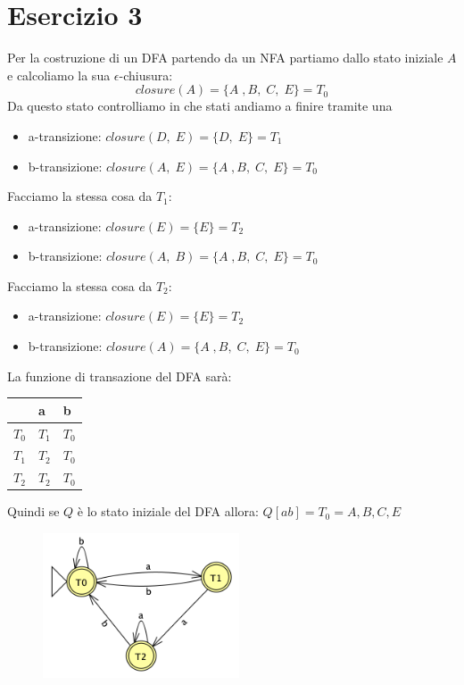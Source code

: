 \documentclass[11pt]{article}
\begin{document}
\section*{Esercizio 3}
Per la costruzione di un DFA partendo da un NFA partiamo dallo
stato iniziale $A$ e calcoliamo la sua $\epsilon$-chiusura:
$$closure(A) = \{A\;,B,\;C,\;E\} = T_0$$
Da questo stato controlliamo in che stati andiamo a finire tramite
una 
\begin{itemize}
  \item a-transizione: $closure(D,\;E) = \{D,\;E\} = T_1$
  \item b-transizione: $closure(A,\;E) = \{A\;,B,\;C,\;E\} = T_0$
\end{itemize}
Facciamo la stessa cosa da $T_1$:
\begin{itemize}
  \item a-transizione: $closure(E) = \{E\} = T_2$
  \item b-transizione: $closure(A,\;B) = \{A\;,B,\;C,\;E\} = T_0$
\end{itemize}
Facciamo la stessa cosa da $T_2$:
\begin{itemize}
  \item a-transizione: $closure(E) = \{E\} = T_2$
  \item b-transizione: $closure(A) = \{A\;,B,\;C,\;E\} = T_0$
\end{itemize}
La funzione di transazione del DFA sarà:
\begin{table}[H]
  \centering
  \begin{tabularx}{\textwidth}{|>{\centering\arraybackslash}X|>{\centering\arraybackslash}X|>{\centering\arraybackslash}X|}
  \hline
  & \textbf{a} & \textbf{b}  \\
  \hline
  $T_0$ & $T_1$ & $T_0$\\
  \hline
  $T_1$ & $T_2$ & $T_0$ \\
  \hline
  $T_2$ & $T_2$ & $T_0$ \\
  \hline
  \end{tabularx}
  \label{tab:03-parsing-table}
\end{table}
Quindi se $Q$ è lo stato iniziale del DFA allora: $Q[ab] = T_0 = {A, B, C, E}$
\begin{figure}[H]
  \centering
  \includegraphics[height=4.3cm]{img/03DFA.png}
  \label{fig:03-DFA}
\end{figure} 
\end{document}
